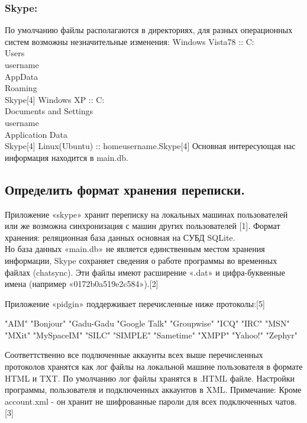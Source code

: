 \subsubsection{Skype:}
По умолчанию файлы располагаются в директориях, для разных операционных систем возможны незначительные изменения: 
Windows Vista\/7\/8 :: C:\\Users\\username\\AppData\\Roaming\\Skype[4]
Windows XP 		:: C:\\Documents and Settings\\username\\Application Data\\Skype[4]
Linux(Ubuntu) 	:: \/home\/username\/.Skype[4]
Основная интересующая нас информация находится в main.db.\\


\subsection{Определить формат хранения переписки.}

Приложение «skype» хранит переписку на локальных машинах пользователей или же возможна синхронизация с машин других пользователей [1]. Формат хранения: реляционная база данных основная на СУБД SQLite.\\ 
Но база данных «main.db» не является единственным местом хранения информации, Skype сохраняет сведения о работе программы во временных файлах (chatsync). Эти файлы имеют расширение «.dat» и цифра-буквенные имена (например «0172b0a519e2c584»).[2]

Приложение «pidgin» поддерживает перечисленные ниже протоколы:[5]

"AIM"
"Bonjour"
"Gadu-Gadu
"Google Talk"
"Groupwise"
"ICQ"
"IRC"
"MSN"
"MXit"
"MySpaceIM"
"SILC"
"SIMPLE"
"Sametime"
"XMPP"
"Yahoo!"
"Zephyr"

Соответтственно все подлюченные аккаунты всех выше перечисленных протоколов хранятся как лог файлы на локальной машине пользователя в формате HTML и TXT. По умолчанию лог файлы хранятся в .HTML файле. Настройки программы, пользователя и подключенных аккаунтов в XML.
Примечание: Кроме account.xml - он хранит не шифрованные пароли для всех подключенных чатов.[3]

